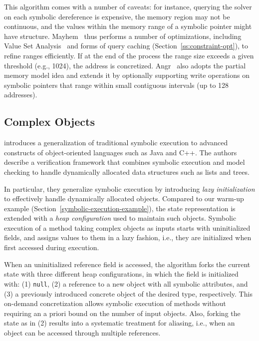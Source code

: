 This algorithm comes with a number of caveats: for instance, querying the solver on each symbolic dereference is expensive, the memory region may not be continuous, and the values within the memory range of a symbolic pointer might have structure. {\sc Mayhem}~\cite{MAYHEM-SP12} thus performs a number of optimizations, including Value Set Analysis~\cite{VSA-CC04} and forms of query caching (Section~\ref{ss:constraint-opt}), to refine ranges efficiently. If at the end of the process the range size exceeds a given threshold (e.g., 1024), the address is concretized. {\sc Angr}~\cite{ANGR-SSP16} also adopts the partial memory model idea and extends it by optionally supporting write operations on symbolic pointers that range within small contiguous intervals (up to 128 addresses). %

\subsection{Complex Objects}
\label{ss:complex-objects}

\cite{KPV-TACAS03} introduces a generalization of traditional symbolic execution to advanced constructs of object-oriented languages such as Java and C++. The authors describe a verification framework that combines symbolic execution and model checking to handle dynamically allocated data structures such as lists and trees. %

In particular, they generalize symbolic execution by introducing {\em lazy initialization} to effectively handle dynamically allocated objects. Compared to our warm-up example (Section~\ref{symbolic-execution-example}), the state representation is extended with a {\em heap configuration} used to maintain such objects. Symbolic execution of a method taking complex objects as inputs starts with uninitialized fields, and assigns values to them in a lazy fashion, i.e., they are initialized when first accessed during execution.

When an uninitialized reference field is accessed, the algorithm forks the current state with three different heap configurations, in which the field is initialized with: (1) {\tt null}, (2) a reference to a new object with all symbolic attributes, and (3) a previously introduced concrete object of the desired type, respectively. This on-demand concretization allows symbolic execution of methods without requiring an a priori bound on the number of input objects. Also, forking the state as in (2) results into a systematic treatment for aliasing, i.e., when an object can be accessed through multiple references.

